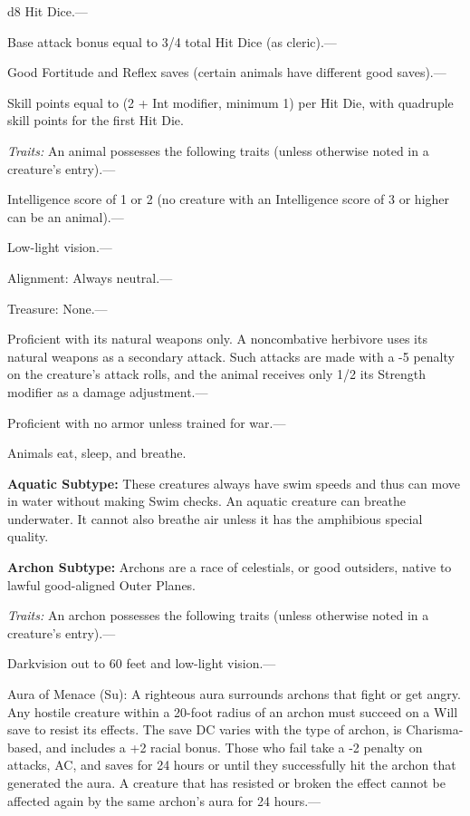 \documentclass{article}
\begin{document}
d8 Hit Dice.---

Base attack bonus equal to 3/4 total Hit Dice (as cleric).---

Good Fortitude and Reflex saves (certain animals have different good saves).---

Skill points equal to (2 + Int modifier, minimum 1) per Hit Die, with quadruple 
skill points for the first Hit Die.

\textit{Traits: }An animal possesses the following traits (unless otherwise noted 
in a creature's entry).---

Intelligence score of 1 or 2 (no creature with an Intelligence score of 3 or higher 
can be an animal).---

Low-light vision.---

Alignment: Always neutral.---

Treasure: None.---

Proficient with its natural weapons only. A noncombative herbivore uses its natural 
weapons as a secondary attack. Such attacks are made with a -5 penalty on the creature's 
attack rolls, and the animal receives only 1/2 its Strength modifier as a damage 
adjustment.---

Proficient with no armor unless trained for war.---

Animals eat, sleep, and breathe.

\vspace{12pt}
\textbf{Aquatic Subtype:} These creatures always have swim speeds and thus can 
move in water without making Swim checks. An aquatic creature can breathe underwater. 
It cannot also breathe air unless it has the amphibious special quality. 

\vspace{12pt}
\textbf{Archon Subtype:} Archons are a race of celestials, or good outsiders, native 
to lawful good-aligned Outer Planes.

\textit{Traits: }An archon possesses the following traits (unless otherwise noted 
in a creature's entry).---

Darkvision out to 60 feet and low-light vision.---

Aura of Menace (Su): A righteous aura surrounds archons that fight or get angry. 
Any hostile creature within a 20-foot radius of an archon must succeed on a Will 
save to resist its effects. The save DC varies with the type of archon, is Charisma-based, 
and includes a +2 racial bonus. Those who fail take a -2 penalty on attacks, AC, 
and saves for 24 hours or until they successfully hit the archon that generated 
the aura. A creature that has resisted or broken the effect cannot be affected 
again by the same archon's aura for 24 hours.---
\end{document}
